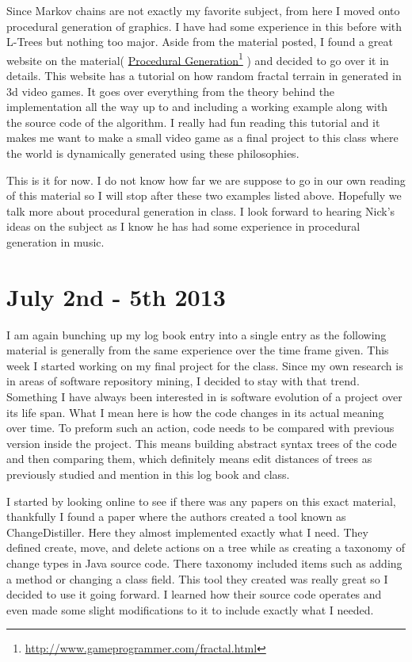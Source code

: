 \documentclass[conference]{IEEEtran}
\newcommand\fnurl[2]{%
  \href{#2}{#1}\footnote{\url{#2}}%
}
\begin{document}
Since Markov chains are not exactly my favorite subject, from here I moved onto procedural generation of graphics.
I have had some experience in this before with L-Trees but nothing too major. Aside from the material posted, I found
a great website on the material(\fnurl{Procedural Generation}{http://www.gameprogrammer.com/fractal.html}) and decided
to go over it in details. This website has a tutorial on how random fractal terrain in generated in 3d video games.
It goes over everything from the theory behind the implementation all the way up to and including a working example
along with the source code of the algorithm. I really had fun reading this tutorial and it makes me want to make
a small video game as a final project to this class where the world is dynamically generated using these philosophies.

This is it for now. I do not know how far we are suppose to go in our own reading of this material so I will stop
after these two examples listed above. Hopefully we talk more about procedural generation in class. I look forward
to hearing Nick's ideas on the subject as I know he has had some experience in procedural generation in music.

\section{July 2nd - 5th 2013}
I am again bunching up my log book entry into a single entry as the following material is generally from the
same experience over the time frame given. This week I started working on my final project for the class. Since my
own research is in areas of software repository mining, I decided to stay with that trend. Something I have always
been interested in is software evolution of a project over its life span. What I mean here is how the code changes
in its actual meaning over time. To preform such an action, code needs to be compared with previous version inside
the project. This means building abstract syntax trees of the code and then comparing them, which definitely means
edit distances of trees as previously studied and mention in this log book and class. 

I started by looking online to see if there was any papers on this exact material, thankfully I found a paper where
the authors created a tool known as ChangeDistiller. Here they almost implemented exactly what I need. They defined
create, move, and delete actions on a tree while as creating a taxonomy of change types in Java source code. There
taxonomy included items such as adding a method or changing a class field. This tool they created was really great
so I decided to use it going forward. I learned how their source code operates and even made some slight modifications
to it to include exactly what I needed. 
\end{document}
